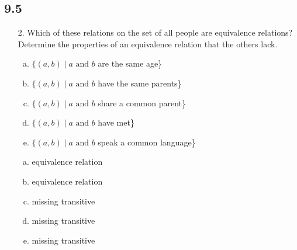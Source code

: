 \subsection{9.5}
\begin{itemize}
    \item[2.]  Which of these relations on the set of all people are equivalence relations? Determine the properties of an equivalence relation that the others lack.
          \begin{enumerate}[a.]
              \item $\{(a, b) \mid a \text{ and } b$ are the same age\}
              \item $\{(a, b) \mid a \text{ and } b$ have the same parents\}
              \item $\{(a, b) \mid a \text{ and } b$ share a common parent\}
              \item $\{(a, b) \mid a \text{ and } b$ have met\}
              \item $\{(a, b) \mid a \text{ and } b$ speak a common language\}
          \end{enumerate}
          \answer
          \begin{enumerate}[a.]
              \item equivalence relation
              \item equivalence relation
              \item missing transitive
              \item missing transitive
              \item missing transitive  
          \end{enumerate}

\end{itemize}
